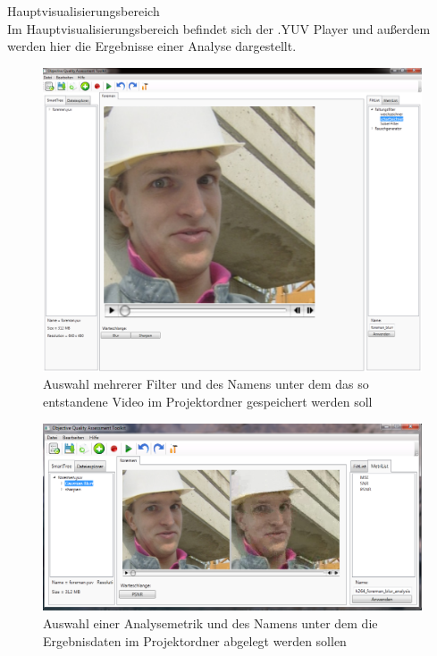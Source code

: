  Hauptvisualisierungsbereich\\
Im Hauptvisualisierungsbereich befindet sich der .YUV Player und außerdem werden hier die Ergebnisse einer
Analyse dargestellt.
\begin{figure}[p]
\includegraphics[scale=0.35]{bilder/screenFilter.png}
\caption{Auswahl mehrerer Filter und des Namens unter dem das so entstandene Video im
Projektordner gespeichert werden soll}
\label{screenFilter}
\end{figure}
\begin{figure}[p]
\includegraphics[scale=0.6]{bilder/screenAnalys.png}
\caption{Auswahl einer Analysemetrik und des Namens unter dem die Ergebnisdaten im 
Projektordner abgelegt werden sollen}
\label{screenAnalys}
\end{figure}
